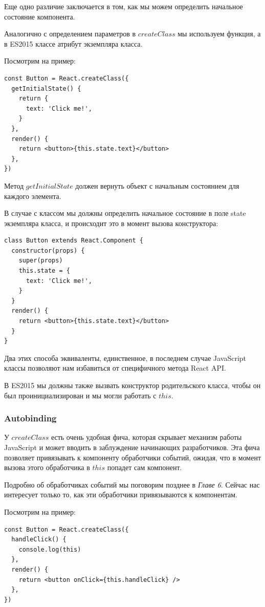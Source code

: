 Еще одно различие заключается в том, как мы можем определить начальное состояние компонента.

Аналогично с определением параметров в $createClass$ мы используем функция, а в ES2015 классе атрибут экземпляра класса.

Посмотрим на пример:

\begin{lstlisting}
const Button = React.createClass({
  getInitialState() {
    return {
      text: 'Click me!',
    } 
  },
  render() {
    return <button>{this.state.text}</button>
  }, 
})
\end{lstlisting}

Метод $getInitialState$ должен вернуть объект с начальным состоянием для каждого элемента.

В случае с классом мы должны определить начальное состояние в поле state экземпляра класса, и происходит это в момент вызова конструктора:

\begin{lstlisting}
class Button extends React.Component {
  constructor(props) {
    super(props)
    this.state = {
      text: 'Click me!',
    }
  }
  render() {
    return <button>{this.state.text}</button>
  } 
}
\end{lstlisting}

Два этих способа эквиваленты, единственное, в последнем случае JavaScript классы позволяют нам избавиться от специфичного метода React API.

В ES2015 мы должны также вызвать конструктор родительского класса, чтобы он был проинициализирован и мы могли работать с $this$.

\subsubsection*{Autobinding}

У $createClass$ есть очень удобная фича, которая скрывает механизм работы JavaScript и может вводить в заблуждение начинающих разработчиков. Эта фича позволяет привязывать к компоненту обработчики событий, ожидая, что в момент вызова этого обработчика в $this$ попадет сам компонент.

Подробно об обработчиках событий мы поговорим позднее в \textit{Главе 6}. Сейчас нас интересует только то, как эти обработчики привязываются к компонентам.

Посмотрим на пример:

\begin{lstlisting}
const Button = React.createClass({
  handleClick() {
    console.log(this)
  },
  render() {
    return <button onClick={this.handleClick} />
  }, 
})
\end{lstlisting}

